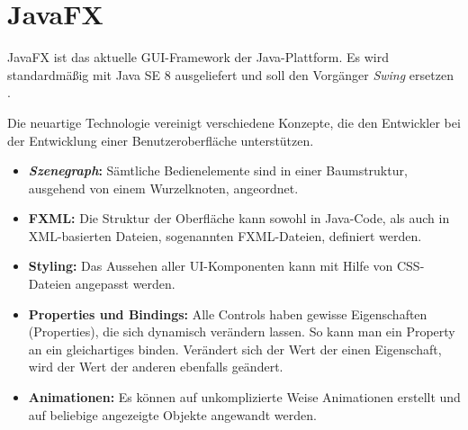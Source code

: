 \section{JavaFX} \label{sec:javaFX}
JavaFX ist das aktuelle GUI-Framework der Java-Plattform. Es wird standardmäßig mit Java SE 8 ausgeliefert und soll den Vorgänger \textit{Swing} ersetzen \cite{Mueller2015}.\par
Die neuartige Technologie vereinigt verschiedene Konzepte, die den Entwickler bei der Entwicklung einer Benutzeroberfläche unterstützen.
\begin{itemize}
	\item \textbf{\textit{Szenegraph}:} Sämtliche Bedienelemente sind in einer Baumstruktur, ausgehend von einem Wurzelknoten, angeordnet.
	\item \textbf{FXML:} Die Struktur der Oberfläche kann sowohl in Java-Code, als auch in XML-basierten Dateien, sogenannten FXML-Dateien, definiert werden.
	\item \textbf{Styling:} Das Aussehen aller UI-Komponenten kann mit Hilfe von CSS-Dateien angepasst werden.
	\item \textbf{Properties und Bindings:} Alle Controls haben gewisse Eigenschaften (Properties), die sich dynamisch verändern lassen. So kann man ein Property an ein gleichartiges binden. Verändert sich der Wert der einen Eigenschaft, wird der Wert der anderen ebenfalls geändert.
		\item \textbf{Animationen:} Es können auf unkomplizierte Weise Animationen erstellt und auf beliebige angezeigte Objekte angewandt werden.
\end{itemize}
